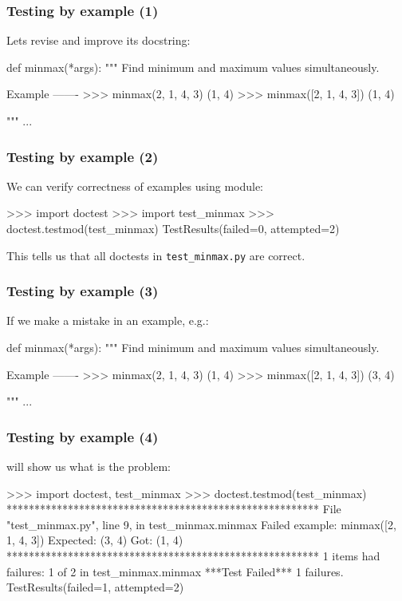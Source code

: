 \documentclass{beamer}
\begin{document}
\begin{frame}[fragile]
    \frametitle{Testing by example (1)}

    Lets revise  and improve its docstring:
    \begin{python}
def minmax(*args):
    """
    Find minimum and maximum values simultaneously.

    Example
    -------
    >>> minmax(2, 1, 4, 3)
    (1, 4)
    >>> minmax([2, 1, 4, 3])
    (1, 4)

    """
    ...
    \end{python}
\end{frame}

\begin{frame}[fragile]
    \frametitle{Testing by example (2)}

    We can verify correctness of examples using  module:
    \begin{python}
 >>> import doctest
 >>> import test_minmax
 >>> doctest.testmod(test_minmax)
TestResults(failed=0, attempted=2)
    \end{python}
    \pause
    This tells us that all doctests in \verb+test_minmax.py+ are correct.
\end{frame}

\begin{frame}[fragile]
    \frametitle{Testing by example (3)}

    If we make a mistake in an example, e.g.:
    \begin{python}
def minmax(*args):
    """
    Find minimum and maximum values simultaneously.

    Example
    -------
    >>> minmax(2, 1, 4, 3)
    (1, 4)
    >>> minmax([2, 1, 4, 3])
    (3, 4)

    """
    ...
    \end{python}
\end{frame}

\begin{frame}[fragile]
    \frametitle{Testing by example (4)}

     will show us what is the problem:
    \begin{python}
 >>> import doctest, test_minmax
 >>> doctest.testmod(test_minmax)
********************************************************
File "test_minmax.py", line 9, in test_minmax.minmax
Failed example:
    minmax([2, 1, 4, 3])
Expected:
    (3, 4)
Got:
    (1, 4)
********************************************************
1 items had failures:
   1 of   2 in test_minmax.minmax
***Test Failed*** 1 failures.
TestResults(failed=1, attempted=2)
    \end{python}
\end{frame}
\end{document}
